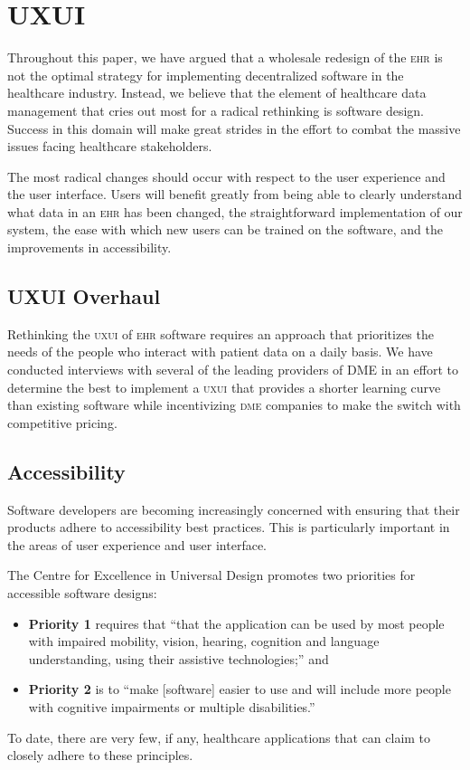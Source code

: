 \section{UXUI}
Throughout this paper, we have argued that a wholesale redesign of the \textsc{ehr} is not the optimal strategy for implementing decentralized software in the healthcare industry. Instead, we believe that the element of healthcare data management that cries out most for a radical rethinking is software design. Success in this domain will make great strides in the effort to combat the massive issues facing healthcare stakeholders.%

The most radical changes should occur with respect to the user experience and the user interface. Users will benefit greatly from being able to clearly understand what data in an \textsc{ehr} has been changed, the straightforward implementation of our system, the ease with which new users can be trained on the software, and the improvements in accessibility.%

\subsection{UXUI Overhaul}
Rethinking the \textsc{uxui} of \textsc{ehr} software requires an approach that prioritizes the needs of the people who interact with patient data on a daily basis. We have conducted interviews with several of the leading providers of DME in an effort to determine the best to implement a \textsc{uxui} that provides a shorter learning curve than existing software while incentivizing \textsc{dme} companies to make the switch with competitive pricing.%

\subsection{Accessibility}
Software developers are becoming increasingly concerned with ensuring that their products adhere to accessibility best practices.\cite{w3Accessibility} This is particularly important in the areas of user experience and user interface.%

The Centre for Excellence in Universal Design\cite{universaldesign} promotes two priorities for accessible software designs:%
  \begin{itemize}
    \item \textbf{Priority 1} requires that ``that the application can be used by most people with impaired mobility, vision, hearing, cognition and language understanding, using their assistive technologies;'' and
    \item \textbf{Priority 2} is to ``make [software] easier to use and will include more people with cognitive impairments or multiple disabilities.''
  \end{itemize}
To date, there are very few, if any, healthcare applications that can claim to closely adhere to these principles.%

